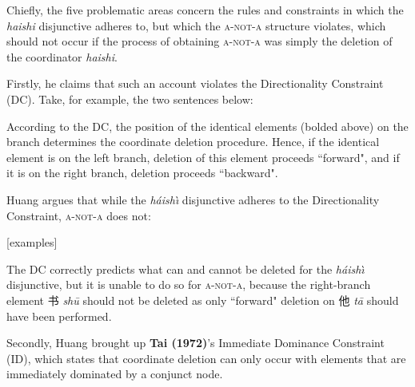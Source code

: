 \documentclass[12pt, UTF8]{article}
\begin{document}
Chiefly, the five problematic areas concern the rules and constraints in which the \textit{haishi} disjunctive adheres to, but which the \textsc{a-not-a} structure violates, which should not occur if the process of obtaining \textsc{a-not-a} was simply the deletion of the coordinator \textit{haishi}.

Firstly, he claims that such an account violates the Directionality Constraint (DC). Take, for example, the two sentences below:

\begin{exe}
\end{exe}

According to the DC, the position of the identical elements (bolded above) on the branch determines the coordinate deletion procedure. Hence, if the identical element is on the left branch, deletion of this element proceeds ``forward", and if it is on the right branch, deletion proceeds ``backward". 

\begin{exe}
\end{exe}

Huang argues that while the \textit{h\'{a}ish\`{\i}} disjunctive adheres to the Directionality Constraint, \textsc{a-not-a} does not:

[examples]

The DC correctly predicts what can and cannot be deleted for the \textit{h\'{a}ish\`{\i}} disjunctive, but it is unable to do so for \textsc{a-not-a}, because the right-branch element 书 \textit{sh\={u}} should not be deleted as only ``forward" deletion on 他 \textit{t\={a}} should have been performed.

Secondly, Huang brought up \textbf{Tai (1972)}'s Immediate Dominance Constraint (ID), which states that coordinate deletion can only occur with elements that are immediately dominated by a conjunct node.
\end{document}
